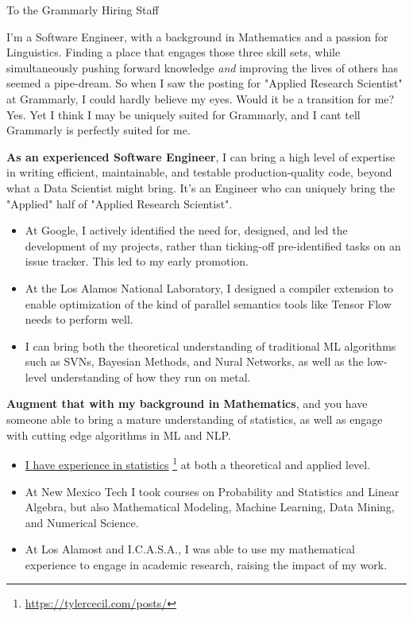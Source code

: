 \documentclass[]{article}
\newcommand{\cvcolor}[1]{{\color{MidnightBlue}#1}}
\newcommand{\hl}[1]{\cvcolor{\textbf{#1}}}
\renewcommand{\cite}[2]{\href{#2}{#1} \footnote{\href{#2}{#2}}}
\begin{document}
\begin{adjustwidth}{40pt}{40pt}

  To the Grammarly Hiring Staff \par \bigskip

  I'm a Software Engineer, with a background in Mathematics and a passion for
  Linguistics. Finding a place that engages those three skill sets, while
  simultaneously pushing forward knowledge \emph{and} improving the lives of
  others has seemed a pipe-dream. So when I saw the posting for "Applied
  Research Scientist" at Grammarly, I could hardly believe my eyes. Would it be
  a transition for me? Yes. Yet I think I may be uniquely suited for Grammarly,
  and I cant tell Grammarly is perfectly suited for me. \medskip

  \hl{As an experienced Software Engineer}, I can bring a high level of
  expertise in writing efficient, maintainable, and testable production-quality
  code, beyond what a Data Scientist might bring. It's an Engineer who can
  uniquely bring the "Applied" half of "Applied Research Scientist".
  \begin{itemize}
    \item At Google, I actively identified the need for, designed, and led the
      development of my projects, rather than ticking-off pre-identified tasks
      on an issue tracker. This led to my early promotion.
    \item At the Los Alamos National Laboratory, I designed a compiler
      extension to enable optimization of the kind of parallel semantics tools
      like Tensor Flow needs to perform well.
    \item I can bring both the theoretical understanding of traditional ML
      algorithms such as SVNs, Bayesian Methods, and Nural Networks, as well as
      the low-level understanding of how they run on metal.
  \end{itemize} \medskip

  \hl{Augment that with my background in Mathematics}, and you have someone
  able to bring a mature understanding of statistics, as well as engage with
  cutting edge algorithms in ML and NLP.
  \begin{itemize}
    \item \cite{I have experience in statistics}{https://tylercecil.com/posts/}
      at both a theoretical and applied level.
    \item At New Mexico Tech I took courses on Probability and Statistics and
      Linear Algebra, but also Mathematical Modeling, Machine Learning, Data
      Mining, and Numerical Science.
    \item At Los Alamost and I.C.A.S.A., I was able to use my mathematical
      experience to engage in academic research, raising the impact of my work.
  \end{itemize} \medskip


\end{adjustwidth}
\end{document}
